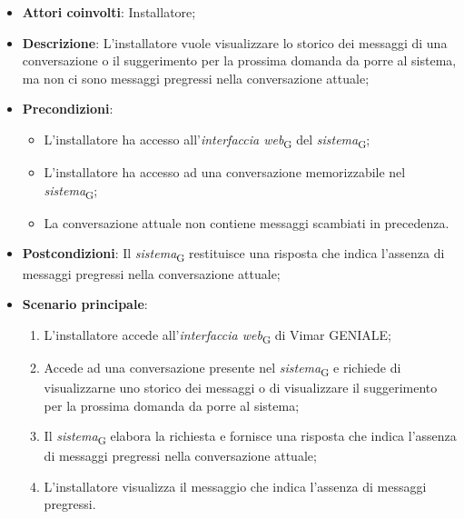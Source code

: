 \begin{itemize}
    \item \textbf{Attori coinvolti}: Installatore;
    \item \textbf{Descrizione}: L’installatore vuole visualizzare lo storico dei messaggi di una conversazione o il suggerimento per la prossima domanda da porre al sistema, ma non ci sono messaggi pregressi nella conversazione attuale;
    \item \textbf{Precondizioni}: 
    \begin{itemize}
        \item L’installatore ha accesso all’\textit{interfaccia web}\textsubscript{G} del \textit{sistema}\textsubscript{G};
        \item L’installatore ha accesso ad una conversazione memorizzabile nel \textit{sistema}\textsubscript{G};
        \item La conversazione attuale non contiene messaggi scambiati in precedenza.
    \end{itemize}
    \item \textbf{Postcondizioni}: Il \textit{sistema}\textsubscript{G} restituisce una risposta che indica l’assenza di messaggi pregressi nella conversazione attuale;
    \item \textbf{Scenario principale}:
    \begin{enumerate}
        \item L’installatore accede all’\textit{interfaccia web}\textsubscript{G} di Vimar GENIALE;
        \item Accede ad una conversazione presente nel \textit{sistema}\textsubscript{G} e richiede di visualizzarne uno storico dei messaggi o di visualizzare il suggerimento per la prossima domanda da porre al sistema;
        \item Il \textit{sistema}\textsubscript{G} elabora la richiesta e fornisce una risposta che indica l’assenza di messaggi pregressi nella conversazione attuale;
        \item L’installatore visualizza il messaggio che indica l’assenza di messaggi pregressi.
    \end{enumerate}
\end{itemize}



